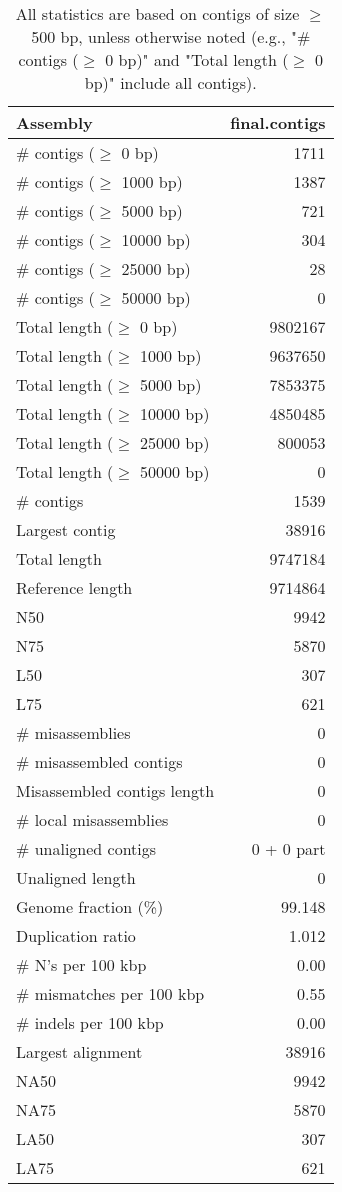 \documentclass[12pt,a4paper]{article}
\begin{document}
\begin{table}[ht]
\begin{center}
\caption{All statistics are based on contigs of size $\geq$ 500 bp, unless otherwise noted (e.g., "\# contigs ($\geq$ 0 bp)" and "Total length ($\geq$ 0 bp)" include all contigs).}
\begin{tabular}{|l*{1}{|r}|}
\hline
Assembly & final.contigs \\ \hline
\# contigs ($\geq$ 0 bp) & 1711 \\ \hline
\# contigs ($\geq$ 1000 bp) & 1387 \\ \hline
\# contigs ($\geq$ 5000 bp) & 721 \\ \hline
\# contigs ($\geq$ 10000 bp) & 304 \\ \hline
\# contigs ($\geq$ 25000 bp) & 28 \\ \hline
\# contigs ($\geq$ 50000 bp) & 0 \\ \hline
Total length ($\geq$ 0 bp) & 9802167 \\ \hline
Total length ($\geq$ 1000 bp) & 9637650 \\ \hline
Total length ($\geq$ 5000 bp) & 7853375 \\ \hline
Total length ($\geq$ 10000 bp) & 4850485 \\ \hline
Total length ($\geq$ 25000 bp) & 800053 \\ \hline
Total length ($\geq$ 50000 bp) & 0 \\ \hline
\# contigs & 1539 \\ \hline
Largest contig & 38916 \\ \hline
Total length & 9747184 \\ \hline
Reference length & 9714864 \\ \hline
N50 & 9942 \\ \hline
N75 & 5870 \\ \hline
L50 & 307 \\ \hline
L75 & 621 \\ \hline
\# misassemblies & 0 \\ \hline
\# misassembled contigs & 0 \\ \hline
Misassembled contigs length & 0 \\ \hline
\# local misassemblies & 0 \\ \hline
\# unaligned contigs & 0 + 0 part \\ \hline
Unaligned length & 0 \\ \hline
Genome fraction (\%) & 99.148 \\ \hline
Duplication ratio & 1.012 \\ \hline
\# N's per 100 kbp & 0.00 \\ \hline
\# mismatches per 100 kbp & 0.55 \\ \hline
\# indels per 100 kbp & 0.00 \\ \hline
Largest alignment & 38916 \\ \hline
NA50 & 9942 \\ \hline
NA75 & 5870 \\ \hline
LA50 & 307 \\ \hline
LA75 & 621 \\ \hline
\end{tabular}
\end{center}
\end{table}
\end{document}
